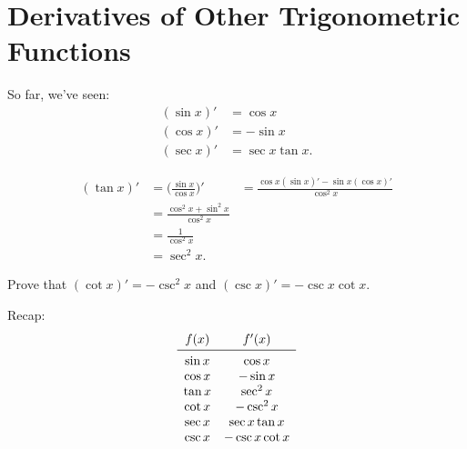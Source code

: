 \section{Derivatives of Other Trigonometric Functions}
So far, we've seen:
\begin{align*}
    (\sin x)' & =\cos x        \\
    (\cos x)' & =-\sin x       \\
    (\sec x)' & =\sec x\tan x.
\end{align*}
\begin{Example}{}{}
    \begin{align*}
        (\tan x)'
         & =\biggl(\frac{\sin x}{\cos x}\biggr)'
         & =\frac{\cos x(\sin x)'-\sin x(\cos x)'}{\cos^2 x} \\
         & =\frac{\cos^2 x+\sin^2 x}{\cos^2 x}               \\
         & =\frac{1}{\cos^2 x}                               \\
         & =\sec^2 x .
    \end{align*}
\end{Example}
\begin{Exercise}{}{}
    Prove that $ (\cot x)'=-\csc^2 x $ and $ (\csc x)'=-\csc x\cot x $.
\end{Exercise}
Recap:
\[ \begin{array}{cc}
        f(x)   & f'(x)         \\
        \midrule
        \sin x & \cos x        \\
        \cos x & -\sin x       \\
        \tan x & \sec^2 x      \\
        \cot x & -\csc^2 x     \\
        \sec x & \sec x\tan x  \\
        \csc x & -\csc x\cot x \\
    \end{array} \]
